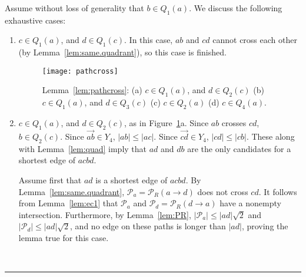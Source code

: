 \pdfoutput=1  \documentclass[11pt]{article}
\newcommand{\qed}{\rule{0.5em}{1.5ex}}
\newcommand{\fqed}{{\hfill~\qed}}
\newenvironment{proof}{{\noindent \bf Proof.}}
                      {{\hfill \fqed} \vspace{1em}}
\newcommand{\Pa}{{\mathcal P}}
\begin{document}
\begin{proof}
Assume without loss of generality that $b \in Q_1(a)$.
We discuss the following exhaustive cases:
\begin{enumerate}
\item $c \in Q_1(a)$, and $d \in Q_1(c)$.
In this case, $ab$ and $cd$ cannot cross each other
(by Lemma~\ref{lem:same.quadrant}), so this case is finished.
\begin{figure}[htbp]
\centering
\texttt{[image: pathcross]}
\caption{Lemma~\ref{lem:pathcross}: (a) $c \in Q_1(a)$, and $d \in Q_2(c)$
(b)$c \in Q_1(a)$, and $d \in Q_3(c)$
(c) $c \in Q_2(a)$ (d) $c \in Q_4(a)$.}
\label{fig:pathcross}
\end{figure}
\item $c \in Q_1(a)$, and $d \in Q_2(c)$, as in
Figure~\ref{fig:pathcross}a. Since $ab$ crosses $cd$, $b \in Q_2(c)$.
Since $\overrightarrow{ab} \in Y_4$, $|ab| \le |ac|$.
Since $\overrightarrow{cd} \in Y_4$, $|cd| \le |cb|$.
These along with Lemma~\ref{lem:quad} imply that $ad$ and $db$ are the only
candidates for a shortest edge of $acbd$.

Assume first that $ad$ is a shortest edge of $acbd$.
By Lemma~\ref{lem:same.quadrant},
$\Pa_a = \Pa_R(a \rightarrow d)$ does not cross $cd$.
It follows from
Lemma~\ref{lem:ec1}
that $\Pa_a$ and
$\Pa_d = \Pa_R(d \rightarrow a)$ have a nonempty intersection.
Furthermore, by Lemma~\ref{lem:PR},
$|\Pa_a| \le |ad| \sqrt{2}$ and
$|\Pa_d| \le |ad| \sqrt{2}$, and no edge on these paths
is longer than $|ad|$, proving the lemma
true for this case.


\end{enumerate}
\end{proof}
\end{document}
